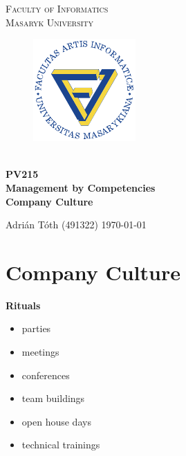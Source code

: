 \documentclass[11pt,a4paper]{article}
\begin{document}
\begin{titlepage}
    \begin{center}
        \Huge{
            \textsc{
                Faculty of Informatics\\
                \hspace{25px}Masaryk University
            }
        }
        \vspace{50px}
        \begin{figure}[!h]
            \centering
            \includegraphics[scale=3]{muni-fi-logo.pdf}
        \end{figure}
        \\[15mm]
        \Huge{
            \textbf{
                PV215
            }
        }
        \\[1.5mm]
        \huge{
            \textbf{
                Management by Competencies
            }
        }
        \\[2.5em]
        \LARGE{
            \textbf{
                Company Culture
            }
        }
        \vfill
    \end{center}
        \Large{
            Adrián Tóth (491322) \hfill \today
        }

\end{titlepage}

\setlength{\parskip}{0pt}
    \hypersetup{hidelinks}\tableofcontents
\setlength{\parskip}{0pt}

\newpage

\section{Company Culture}

\textbf{Rituals}\\[-7.5mm]
\begin{itemize}
    \item parties\\[-7.5mm]
    \item meetings\\[-7.5mm]
    \item conferences\\[-7.5mm]
    \item team buildings\\[-7.5mm]
    \item open house days\\[-7.5mm]
    \item technical trainings
\end{itemize}
\end{document}
